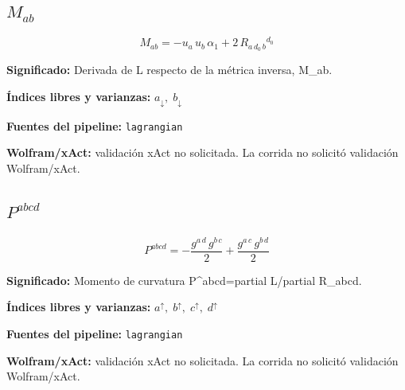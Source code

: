 \documentclass[11pt]{article}
\begin{document}
\subsection*{$ M_{ab} $}
\begin{dmath*}[breakdepth={5}]
M_{ab} = -u{}_{a}\,u{}_{b}\,\alpha_{1} + 2\,R{}_{a\,d_{0}\,b}{}^{d_{0}}
\end{dmath*}
\par\vspace{1.2\baselineskip}\noindent
\begin{minipage}{\linewidth}
\textbf{Significado:} Derivada de L respecto de la métrica inversa, M\_ab.\par
\textbf{Índices libres y varianzas:} $ a_{\downarrow},\;b_{\downarrow} $\par
\textbf{Fuentes del pipeline:} \texttt{lagrangian}\par
\textbf{Wolfram/xAct:} validación xAct no solicitada. La corrida no solicitó validación Wolfram/xAct.\par
\end{minipage}
\subsection*{$ P^{abcd} $}
\begin{dmath*}[breakdepth={5}]
P^{abcd} = -\frac{g{}^{a\,d}\,g{}^{b\,c}}{2} + \frac{g{}^{a\,c}\,g{}^{b\,d}}{2}
\end{dmath*}
\par\vspace{1.2\baselineskip}\noindent
\begin{minipage}{\linewidth}
\textbf{Significado:} Momento de curvatura P^{abcd}=partial L/partial R\_abcd.\par
\textbf{Índices libres y varianzas:} $ a^{\uparrow},\;b^{\uparrow},\;c^{\uparrow},\;d^{\uparrow} $\par
\textbf{Fuentes del pipeline:} \texttt{lagrangian}\par
\textbf{Wolfram/xAct:} validación xAct no solicitada. La corrida no solicitó validación Wolfram/xAct.\par
\end{minipage}
\end{document}
